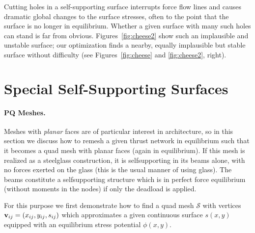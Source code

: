 \documentclass[review]{acmsiggraph}
\def\SS{{\mathcal S}}
\begin{document}
Cutting holes in a self-supporting surface interrupts force flow lines and 
causes dramatic global changes to the surface stresses, often to the point 
that the surface is no longer in equilibrium. Whether a given surface with 
many such holes can stand is far from obvious. Figures~\ref{fig:cheese2} 
show such an implausible and unstable surface; our optimization finds a 
nearby, equally implausible but stable surface without difficulty (see 
Figures~\ref{fig:cheese} and \ref{fig:cheese2}, right).



\section{Special Self-Supporting Surfaces} \label{sec:special}

\paragraph{PQ Meshes.}

Meshes with {\em planar} faces are of particular interest in architecture, 
so in this section we discuss how to remesh a given thrust network in 
equilibrium such that it becomes a quad mesh with planar faces (again in 
equilibrium). If this mesh is realized as a steel\dash glass construction,
it is self\dash supporting in its beams alone, with no forces exerted on
the glass (this is the usual manner of using glass). The beams constitute
a self\dash supporting structure which is in perfect force equilibrium
(without moments in the nodes) if only the deadload is applied.


For this purpose we first demonstrate how to find a quad 
mesh $\SS$ with vertices ${\mathbf v}_{ij}=(x_{ij},y_{ij},s_{ij})$ which 
approximates a given continuous surface $s(x,y)$ equipped with an 
equilibrium stress potential $\phi(x,y)$.
\end{document}
